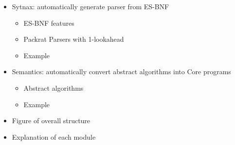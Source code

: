 \begin{itemize}
  \item Sytnax: automatically generate parser from ES-BNF
    \begin{itemize}
      \item ES-BNF features
      \item Packrat Parsers with 1-lookahead
      \item Example
    \end{itemize}
  \item Semantics: automatically convert abstract algorithms into Core programs
    \begin{itemize}
      \item Abstract algorithms
      \item Example
    \end{itemize}
\end{itemize}
\begin{itemize}
  \item Figure of overall structure
  \item Explanation of each module
\end{itemize}
